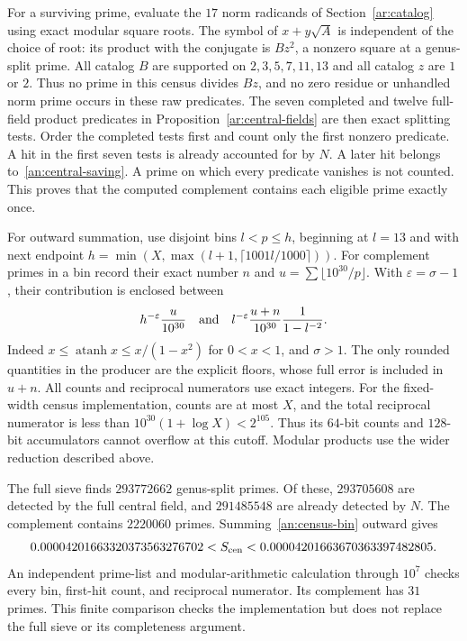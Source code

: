 For a surviving prime, evaluate the $17$ norm radicands of
Section~\ref{ar:catalog} using exact modular square roots. The symbol of
$x+y\sqrt A$ is independent of the choice of root: its product with
the conjugate is $Bz^2$, a nonzero square at a genus-split prime.
All catalog $B$ are supported on $2,3,5,7,11,13$ and all catalog
$z$ are $1$ or $2$. Thus no prime in this census divides $Bz$,
and no zero residue or unhandled norm prime occurs in these raw
predicates.
The seven completed and twelve full-field product predicates in
Proposition~\ref{ar:central-fields} are then exact splitting tests.
Order the completed tests first and count only the first nonzero
predicate. A hit in the first seven tests is already accounted for by
$N$. A later hit belongs to~\eqref{an:central-saving}. A prime on
which every predicate vanishes is not counted. This proves that the
computed complement contains each eligible prime exactly once.

For outward summation, use disjoint bins $l<p\leq h$, beginning at
$l=13$ and with next endpoint
$h=\min(X,\max(l+1,\lceil1001l/1000\rceil))$.
For complement primes in a bin record their exact number $n$ and
$u=\sum\lfloor10^{30}/p\rfloor$. With $\varepsilon=\sigma-1$,
their contribution is enclosed between
\begin{equation}\label{an:census-bin}
 h^{-\varepsilon}\frac{u}{10^{30}}
 \quad\hbox{and}\quad
 l^{-\varepsilon}\frac{u+n}{10^{30}}
                         \frac1{1-l^{-2}}.
\end{equation}
Indeed $x\leq\operatorname{atanh}x\leq x/(1-x^2)$ for $0<x<1$,
and $\sigma>1$. The only rounded quantities in the producer are the
explicit floors, whose full error is included in $u+n$.
All counts and reciprocal numerators use exact integers.
For the fixed-width census implementation, counts are at most $X$, and
the total reciprocal numerator is less than
$10^{30}(1+\log X)<2^{105}$. Thus its $64$-bit counts and $128$-bit
accumulators cannot overflow at this cutoff. Modular products use the
wider reduction described above.

The full sieve finds $293772662$ genus-split primes. Of these,
$293705608$ are detected by the full central field, and $291485548$
are already detected by $N$. The complement contains
$2220060$ primes. Summing~\eqref{an:census-bin} outward gives
\begin{equation}\label{an:census-value}
 0.00004201663320373563276702<S_{\rm cen}
          <0.00004201663670363397482805.
\end{equation}
An independent prime-list and modular-arithmetic calculation through
$10^7$ checks every bin, first-hit count, and reciprocal numerator.
Its complement has $31$ primes. This finite comparison checks the
implementation but does not replace the full sieve or its completeness
argument.

